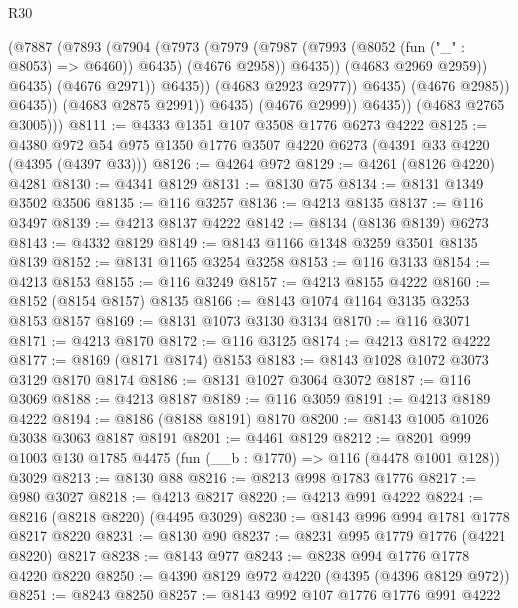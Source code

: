 \begin{lexlean}{R30}
\begin{coremodule}
                                (@7887
                                  (@7893
                                    (@7904
                                      (@7973
                                        (@7979
                                          (@7987
                                            (@7993 (@8052 (fun ("_" : @8053) => @6460)) @6435)
                                            (@4676 @2958))
                                          @6435))
                                      (@4683 @2969 @2959))
                                    @6435)
                                  (@4676 @2971))
                                @6435))
                            (@4683 @2923 @2977))
                          @6435)
                        (@4676 @2985))
                      @6435))
                  (@4683 @2875 @2991))
                @6435)
              (@4676 @2999))
            @6435))
        (@4683 @2765 @3005)))
@8111 := @4333 @1351 @107 @3508 @1776 @6273 @4222
@8125 := @4380 @972 @54 @975 @1350 @1776 @3507 @4220 @6273 (@4391 @33 @4220 (@4395 (@4397 @33)))
@8126 := @4264 @972
@8129 := @4261 (@8126 @4220) @4281
@8130 := @4341 @8129
@8131 := @8130 @75
@8134 := @8131 @1349 @3502 @3506
@8135 := @116 @3257
@8136 := @4213 @8135
@8137 := @116 @3497
@8139 := @4213 @8137 @4222
@8142 := @8134 (@8136 @8139) @6273
@8143 := @4332 @8129
@8149 := @8143 @1166 @1348 @3259 @3501 @8135 @8139
@8152 := @8131 @1165 @3254 @3258
@8153 := @116 @3133
@8154 := @4213 @8153
@8155 := @116 @3249
@8157 := @4213 @8155 @4222
@8160 := @8152 (@8154 @8157) @8135
@8166 := @8143 @1074 @1164 @3135 @3253 @8153 @8157
@8169 := @8131 @1073 @3130 @3134
@8170 := @116 @3071
@8171 := @4213 @8170
@8172 := @116 @3125
@8174 := @4213 @8172 @4222
@8177 := @8169 (@8171 @8174) @8153
@8183 := @8143 @1028 @1072 @3073 @3129 @8170 @8174
@8186 := @8131 @1027 @3064 @3072
@8187 := @116 @3069
@8188 := @4213 @8187
@8189 := @116 @3059
@8191 := @4213 @8189 @4222
@8194 := @8186 (@8188 @8191) @8170
@8200 := @8143 @1005 @1026 @3038 @3063 @8187 @8191
@8201 := @4461 @8129
@8212 := @8201 @999 @1003 @130 @1785 @4475 (fun (__b : @1770) => @116 (@4478 @1001 @128)) @3029
@8213 := @8130 @88
@8216 := @8213 @998 @1783 @1776
@8217 := @980 @3027
@8218 := @4213 @8217
@8220 := @4213 @991 @4222
@8224 := @8216 (@8218 @8220) (@4495 @3029)
@8230 := @8143 @996 @994 @1781 @1778 @8217 @8220
@8231 := @8130 @90
@8237 := @8231 @995 @1779 @1776 (@4221 @8220) @8217
@8238 := @8143 @977
@8243 := @8238 @994 @1776 @1778 @4220 @8220
@8250 := @4390 @8129 @972 @4220 (@4395 (@4396 @8129 @972))
@8251 := @8243 @8250
@8257 := @8143 @992 @107 @1776 @1776 @991 @4222

\end{coremodule}
\end{lexlean}
